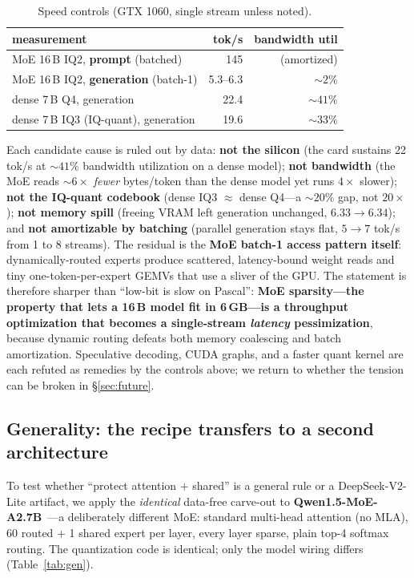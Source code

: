 \documentclass[10pt]{article}
\begin{document}
\begin{table}[h]\centering\small
\begin{tabular}{lrr}
\toprule
measurement & tok/s & bandwidth util \\
\midrule
MoE 16\,B IQ2, \textbf{prompt} (batched) & 145 & (amortized) \\
MoE 16\,B IQ2, \textbf{generation} (batch-1) & 5.3--6.3 & ${\sim}2\%$ \\
dense 7\,B Q4, generation & 22.4 & ${\sim}41\%$ \\
dense 7\,B IQ3 (IQ-quant), generation & 19.6 & ${\sim}33\%$ \\
\bottomrule
\end{tabular}
\caption{Speed controls (GTX 1060, single stream unless noted).}
\label{tab:speed}
\end{table}

Each candidate cause is ruled out by data: \textbf{not the silicon} (the card sustains 22 tok/s at
${\sim}41\%$ bandwidth utilization on a dense model); \textbf{not bandwidth} (the MoE reads ${\sim}6\times$
\emph{fewer} bytes/token than the dense model yet runs $4\times$ slower); \textbf{not the IQ-quant
codebook} (dense IQ3 $\approx$ dense Q4---a ${\sim}20\%$ gap, not $20\times$); \textbf{not memory spill}
(freeing VRAM left generation unchanged, $6.33\to6.34$); and \textbf{not amortizable by batching}
(parallel generation stays flat, $5\to7$ tok/s from 1 to 8 streams). The residual is the \textbf{MoE
batch-1 access pattern itself}: dynamically-routed experts produce scattered, latency-bound weight reads
and tiny one-token-per-expert GEMVs that use a sliver of the GPU. The statement is therefore sharper than
``low-bit is slow on Pascal'': \textbf{MoE sparsity---the property that lets a 16\,B model fit in
6\,GB---is a throughput optimization that becomes a single-stream \emph{latency} pessimization}, because
dynamic routing defeats both memory coalescing and batch amortization. Speculative decoding, CUDA
graphs, and a faster quant kernel are each refuted as remedies by the controls above; we return to
whether the tension can be broken in \S\ref{sec:future}.

\subsection{Generality: the recipe transfers to a second architecture}\label{sec:gen}
To test whether ``protect attention $+$ shared'' is a general rule or a DeepSeek-V2-Lite artifact, we
apply the \emph{identical} data-free carve-out to \textbf{Qwen1.5-MoE-A2.7B}~\cite{qwenmoe}---a
deliberately different MoE: standard multi-head attention (no MLA), 60 routed $+$ 1 shared expert per
layer, every layer sparse, plain top-4 softmax routing. The quantization code is identical; only the
model wiring differs (Table~\ref{tab:gen}).
\end{document}
